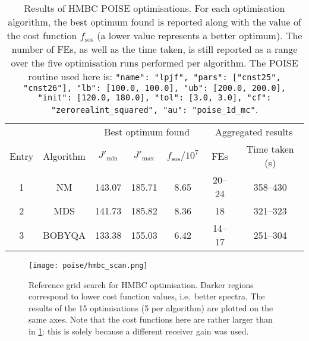 \begin{table}[htb]
    \centering
    \begin{tabular}{ccccccc}
        \toprule
              &           & \multicolumn{3}{c}{Best optimum found} & \multicolumn{2}{c}{Aggregated results} \\
        \cmidrule(lr){3-5} \cmidrule(lr){6-7}
        Entry & Algorithm & $J'_\text{min}$ & $J'_\text{max}$ & $f_\text{sos} / 10^7$ & FEs & Time taken (\unit{\s}) \\
        \midrule
        1     & NM        & 143.07 & 185.71                 & 8.65 & 20--24 & 358--430 \\
        2     & MDS       & 141.73 & 185.82                 & 8.36 & 18     & 321--323 \\
        3     & BOBYQA    & 133.38 & 155.03                 & 6.42 & 14--17 & 251--304 \\
        \bottomrule
    \end{tabular}
    \caption[HMBC low-pass J-filter optimisations]{
        Results of HMBC POISE optimisations.
        For each optimisation algorithm, the best optimum found is reported along with the value of the cost function $f_\text{sos}$ (a lower value represents a better optimum).
        The number of FEs, as well as the time taken, is still reported as a range over the five optimisation runs performed per algorithm.
        The POISE routine used here is: \texttt{{"name": "lpjf", "pars": ["cnst25", "cnst26"], "lb": [100.0, 100.0], "ub": [200.0, 200.0], "init": [120.0, 180.0], "tol": [3.0, 3.0], "cf": "zerorealint_squared", "au": "poise_1d_mc"}}.
    }
    \label{tbl:poise_hmbc}
\end{table}

\begin{figure}[htb]
    \centering
    \texttt{[image: poise/hmbc\_scan.png]}%
    \caption[Reference grid search for HMBC optimisation]{
        Reference grid search for HMBC optimisation.
        Darker regions correspond to lower cost function values, i.e.\ better spectra.
        The results of the 15 optimisations (5 per algorithm) are plotted on the same axes.
        Note that the cost functions here are rather larger than in \cref{tbl:poise_hmbc}: this is solely because a different receiver gain was used.
    }
    \label{fig:poise_hmbc_scan}
\end{figure}

